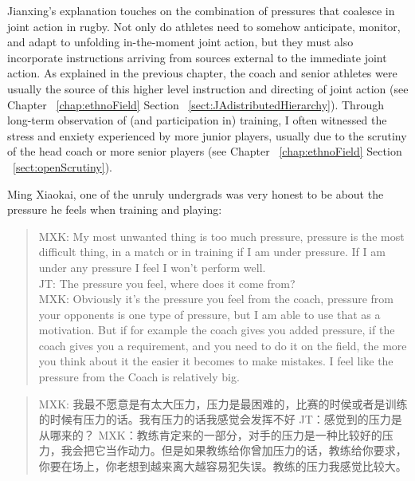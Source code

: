 \begin{CJK}{UTF8}{gbsn}
Jianxing's explanation touches on the combination of pressures that coalesce in joint action in rugby.  Not only do athletes need to somehow anticipate, monitor, and adapt to unfolding in-the-moment joint action, but they must also incorporate instructions arriving from sources external to the immediate joint action.  As explained in the previous chapter, the coach and senior athletes were usually the source of this higher level instruction and directing of joint action (see Chapter ~\ref{chap:ethnoField} Section ~\ref{sect:JAdistributedHierarchy}).  Through long-term observation of (and participation in) training, I often witnessed the stress and enxiety experienced by more junior players, usually due to the scrutiny of the head coach or more senior players (see Chapter ~\ref{chap:ethnoField} Section ~\ref{sect:openScrutiny}).

Ming Xiaokai, one of the unruly undergrads was very honest to be about the pressure he feels when training and playing:

    \begin{quote}
      MXK: My most unwanted thing is too much pressure, pressure is the most difficult thing, in a match or in training if I am under pressure.  If I am under any pressure I feel I won't perform well. \\
      JT: The pressure you feel, where does it come from? \\
      MXK: Obviously it's the pressure you feel from the coach, pressure from your opponents is one type of pressure, but I am able to use that as a motivation. But if for example the coach gives you added pressure, if the coach gives you a requirement, and you need to do it on the field, the more you think about it the easier it becomes to make mistakes.  I feel like the pressure from the Coach is relatively big.
    \end{quote}

    \begin{quote}
      MXK: 我最不愿意是有太大压力，压力是最困难的，比赛的时侯或者是训练的时候有压力的话。我有压力的话我感觉会发挥不好
      JT：感觉到的压力是从哪来的？
      MXK：教练肯定来的一部分，对手的压力是一种比较好的压力，我会把它当作动力。但是如果教练给你曾加压力的话，教练给你要求，你要在场上，你老想到越来离大越容易犯失误。教练的压力我感觉比较大。
    \end{quote}


\end{CJK}
